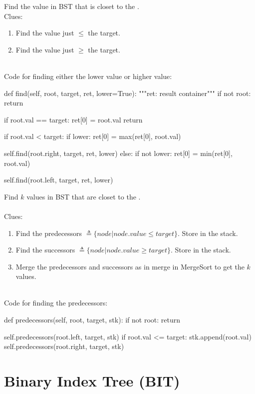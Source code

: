  Find the value in BST that is closet to the .
\\
Clues:
\begin{enumerate}
\item Find the value just $\leq$ the target.
\item Find the value just $\geq$ the target.
\end{enumerate}
\
\\
Code for finding either the lower value or higher value:
\begin{python}
def find(self, root, target, ret, lower=True):
  """ret: result container"""
  if not root: return

  if root.val == target:
    ret[0] = root.val
    return

  if root.val < target:
    if lower:
      ret[0] = max(ret[0], root.val)

    self.find(root.right, target, ret, lower)
  else:
    if not lower:
      ret[0] = min(ret[0], root.val)

    self.find(root.left, target, ret, lower)
\end{python}

 Find $k$ values in BST that are closet to the .
\\\\
Clues:
\begin{enumerate}
\item Find the predecessors $\triangleq \{node | node.value \leq target\}$. Store in the stack. 
\item Find the successors $\triangleq \{node | node.value \geq target\}$. Store in the stack.
\item Merge the predecessors and successors as in merge in MergeSort to get the $k$ values. 
\end{enumerate}
\
\\
Code for finding the predecessors:
\begin{python}
def predecessors(self, root, target, stk):
  if not root: return

  self.predecessors(root.left, target, stk)
  if root.val <= target:
    stk.append(root.val)
    self.predecessors(root.right, target, stk)
\end{python}


\section{Binary Index Tree (BIT)}\label{BIT}

